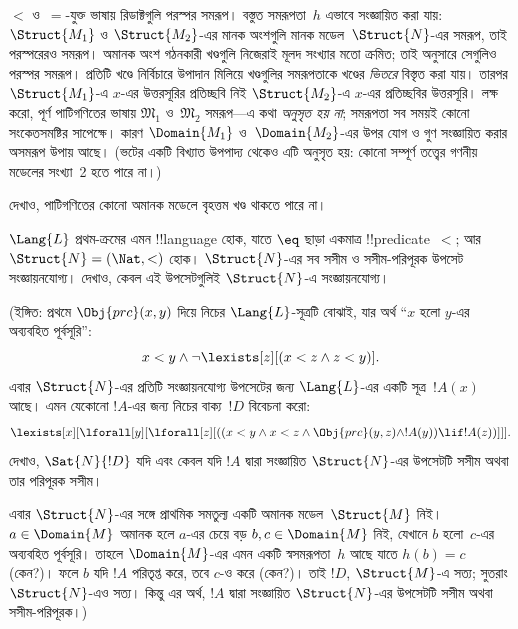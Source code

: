 \documentclass[../../../include/open-logic-section]{subfiles}
\begin{document}
$<$ ও~$=$-যুক্ত ভাষায় রিডাক্টগুলি পরস্পর সমরূপ। বস্তুত
সমরূপতা~$h$ এভাবে সংজ্ঞায়িত করা যায়: $\Struct{M_1}$ ও
$\Struct{M_2}$-এর মানক অংশগুলি মানক মডেল~$\Struct{N}$-এর
সমরূপ, তাই পরস্পরেরও সমরূপ। অমানক অংশ গঠনকারী খণ্ডগুলি
নিজেরাই মূলদ সংখ্যার মতো ক্রমিত; তাই
 অনুসারে সেগুলিও পরস্পর সমরূপ।
প্রতিটি খণ্ডে নির্বিচারে উপাদান মিলিয়ে খণ্ডগুলির সমরূপতাকে
খণ্ডের \emph{ভিতরে} বিস্তৃত করা যায়। তারপর $\Struct{M_1}$-এ
$x$-এর উত্তরসূরির প্রতিচ্ছবি নিই $\Struct{M_2}$-এ
$x$-এর প্রতিচ্ছবির উত্তরসূরি। লক্ষ করো, পূর্ণ পাটিগণিতের
ভাষায় $\mathfrak{M}_1$ ও~$\mathfrak{M}_2$ সমরূপ—এ কথা
\emph{অনুসৃত হয় না}; সমরূপতা সব সময়ই কোনো সংকেতসমষ্টির সাপেক্ষে।
কারণ $\Domain{M_1}$ ও~$\Domain{M_2}$-এর উপর যোগ ও গুণ
সংজ্ঞায়িত করার অসমরূপ উপায় আছে। (ভটের একটি বিখ্যাত উপপাদ্য
থেকেও এটি অনুসৃত হয়: কোনো সম্পূর্ণ তত্ত্বের গণনীয় মডেলের
সংখ্যা~2 হতে পারে না।)

\begin{prob}
দেখাও, পাটিগণিতের কোনো অমানক মডেলে বৃহত্তম খণ্ড থাকতে পারে না।
\end{prob}

\begin{prob}
$\Lang{L}$ প্রথম-ক্রমের এমন !!{language} হোক, যাতে
$\eq$ ছাড়া একমাত্র !!{predicate}~$<$; আর
$\Struct{N} = (\Nat, <)$ হোক। $\Struct{N}$-এর সব
সসীম ও সসীম-পরিপূরক উপসেট সংজ্ঞায়নযোগ্য। দেখাও, কেবল
এই উপসেটগুলিই $\Struct{N}$-এ সংজ্ঞায়নযোগ্য।

(ইঙ্গিত: প্রথমে $\Obj{prc}(x,y)$ দিয়ে নিচের
$\Lang{L}$-সূত্রটি বোঝাই, যার অর্থ “$x$ হলো $y$-এর
অব্যবহিত পূর্বসূরি”:
\[
x<y \land \lnot \lexists[z][(x<z \land z < y)].
\]
এবার $\Struct{N}$-এর প্রতিটি সংজ্ঞায়নযোগ্য উপসেটের জন্য
$\Lang{L}$-এর একটি সূত্র~$!A(x)$ আছে। এমন যেকোনো $!A$-এর
জন্য নিচের বাক্য~$!D$ বিবেচনা করো:
\[
\lexists[x][\lforall[y][\lforall[z][((x<y \land x<z \land \Obj{prc}(y,z)
  \land !A(y)) \lif !A(z))]]].
\]
দেখাও, $\Sat{N}{!D}$ যদি এবং কেবল যদি $!A$ দ্বারা
সংজ্ঞায়িত $\Struct{N}$-এর উপসেটটি সসীম অথবা তার পরিপূরক
সসীম।

এবার $\Struct{N}$-এর সঙ্গে প্রাথমিক সমতুল্য একটি অমানক
মডেল~$\Struct{M}$ নিই। $a \in \Domain{M}$ অমানক হলে
$a$-এর চেয়ে বড় $b,c \in \Domain{M}$ নিই, যেখানে
$b$ হলো~$c$-এর অব্যবহিত পূর্বসূরি। তাহলে
$\Domain{M}$-এর এমন একটি স্বসমরূপতা~$h$ আছে যাতে
$h(b)=c$ (কেন?)। ফলে $b$ যদি $!A$ পরিতৃপ্ত করে, তবে
$c$-ও করে (কেন?)। তাই $!D$, $\Struct{M}$-এ সত্য;
সুতরাং $\Struct{N}$-এও সত্য। কিন্তু এর অর্থ,
$!A$ দ্বারা সংজ্ঞায়িত $\Struct{N}$-এর উপসেটটি সসীম
অথবা সসীম-পরিপূরক।)
\end{prob}
\end{document}
